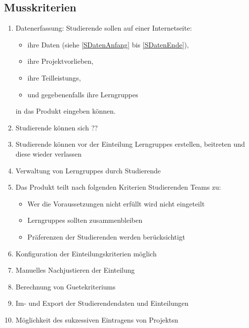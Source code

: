 \documentclass[parskip=full]{scrartcl}
\newcommand{\swtLabel}[1]{\textbf{/#1\arabic*0/}}
\begin{document}
\subsection{Musskriterien}
 \begin{enumerate}[label=\swtLabel{M}]
   \item Datenerfassung: Studierende sollen auf einer Internetseite:   
   \begin{itemize}
     \item ihre Daten (siehe \ref{SDatenAnfang} bis \ref{SDatenEnde}),     
     \item ihre Projektvorlieben, 
     \item ihre \glspl{Teilleistung},
     \item und gegebenenfalls ihre \glspl{Lerngruppe}
   \end{itemize}
   in das Produkt eingeben können.
   \item Studierende können sich ?? %
   \item Studierende können vor der Einteilung \glspl{Lerngruppe} erstellen, beitreten
    und diese wieder verlassen
    \item Verwaltung von \glspl{Lerngruppe} durch Studierende %
   \item Das Produkt teilt nach folgenden Kriterien Studierenden Teams zu:
   \label{Mzuteilung}
   \begin{itemize}
     \item Wer die Voraussetzungen nicht erfüllt wird nicht eingeteilt
     \item \glspl{Lerngruppe} sollten zusammenbleiben
     \item Präferenzen der Studierenden werden berücksichtigt
   \end{itemize}
     \item Konfiguration der Einteilungskriterien möglich
   \item Manuelles Nachjustieren der Einteilung
   \item Berechnung von \glspl{Guetekriterium}
   \item Im- und Export der Studierendendaten und
   Einteilungen %
   \item Möglichkeit des sukzessiven Eintragens von \glspl{Projekt}n
  
 \end{enumerate}
\end{document}
